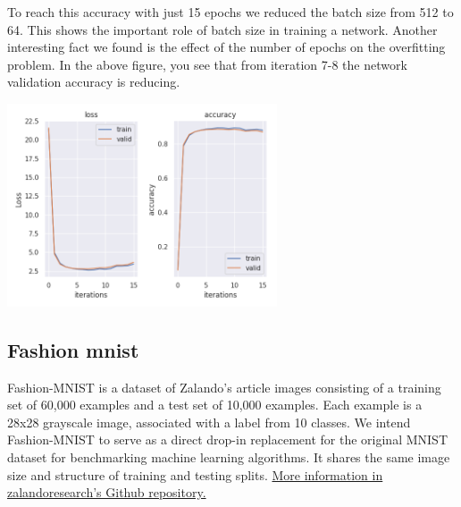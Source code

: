 \documentclass[10pt]{SelfArx} %
\begin{document}
	To reach this accuracy with just 15 epochs we reduced the batch size from 512 to 64. This shows the important role of batch size in training a network. Another interesting fact we found is the effect of the number of epochs on the overfitting problem. In the above figure, you see that from iteration 7-8 the network validation accuracy is reducing.
	
	\begin{center}
		\includegraphics[width=1\linewidth,height=6cm]{img/mnist-plots2}
		\label{fmnist2}
	\end{center}
	
	
	\subsection{Fashion mnist}
	Fashion-MNIST is a dataset of Zalando's article images consisting of a training set of 60,000 examples and a test set of 10,000 examples. Each example is a 28x28 grayscale image, associated with a label from 10 classes. We intend Fashion-MNIST to serve as a direct drop-in replacement for the original MNIST dataset for benchmarking machine learning algorithms. It shares the same image size and structure of training and testing splits. \href{https://github.com/zalandoresearch/fashion-mnist}{More information in zalandoresearch's Github repository.}
	
\end{document}
